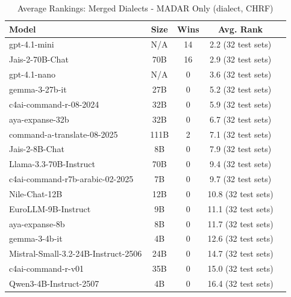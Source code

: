 \begin{table}[htbp]
\centering
\caption{Average Rankings: Merged Dialects - MADAR Only (dialect, CHRF)}
\label{tab:avg_rankings_chrf_dialect}
\begin{tabular}{l@{\hspace{3pt}}c@{\hspace{3pt}}c@{\hspace{3pt}}c@{\hspace{3pt}}c}
\toprule
Model & Size & Wins & Avg. Rank \\
\midrule
gpt-4.1-mini & N/A & 14 & 2.2 (32 test sets) \\
Jais-2-70B-Chat & 70B & 16 & 2.9 (32 test sets) \\
gpt-4.1-nano & N/A & 0 & 3.6 (32 test sets) \\
gemma-3-27b-it & 27B & 0 & 5.2 (32 test sets) \\
c4ai-command-r-08-2024 & 32B & 0 & 5.9 (32 test sets) \\
aya-expanse-32b & 32B & 0 & 6.7 (32 test sets) \\
command-a-translate-08-2025 & 111B & 2 & 7.1 (32 test sets) \\
Jais-2-8B-Chat & 8B & 0 & 7.9 (32 test sets) \\
Llama-3.3-70B-Instruct & 70B & 0 & 9.4 (32 test sets) \\
c4ai-command-r7b-arabic-02-2025 & 7B & 0 & 9.7 (32 test sets) \\
Nile-Chat-12B & 12B & 0 & 10.8 (32 test sets) \\
EuroLLM-9B-Instruct & 9B & 0 & 11.1 (32 test sets) \\
aya-expanse-8b & 8B & 0 & 11.7 (32 test sets) \\
gemma-3-4b-it & 4B & 0 & 12.6 (32 test sets) \\
Mistral-Small-3.2-24B-Instruct-2506 & 24B & 0 & 14.7 (32 test sets) \\
c4ai-command-r-v01 & 35B & 0 & 15.0 (32 test sets) \\
Qwen3-4B-Instruct-2507 & 4B & 0 & 16.4 (32 test sets) \\
\bottomrule
\end{tabular}
\end{table}
